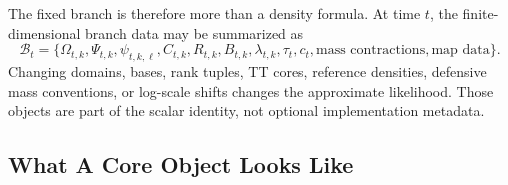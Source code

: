 The fixed branch is therefore more than a density formula.  At time \(t\), the
finite-dimensional branch data may be summarized as
\begin{equation}
  \mathcal B_t=
  \{\Omega_{t,k},\Psi_{t,k},\psi_{t,k,\ell},C_{t,k},R_{t,k},B_{t,k},
    \lambda_{t,k},\tau_t,c_t,\text{mass contractions},\text{map data}\}.
  \label{eq:bf-hd-squared-tt-branch-data}
\end{equation}
Changing domains, bases, rank tuples, TT cores, reference densities, defensive
mass conventions, or log-scale shifts changes the approximate likelihood.  Those
objects are part of the scalar identity, not optional implementation metadata.

\subsection{What A Core Object Looks Like}
\label{sec:bf-hd-squared-tt-core-object}

